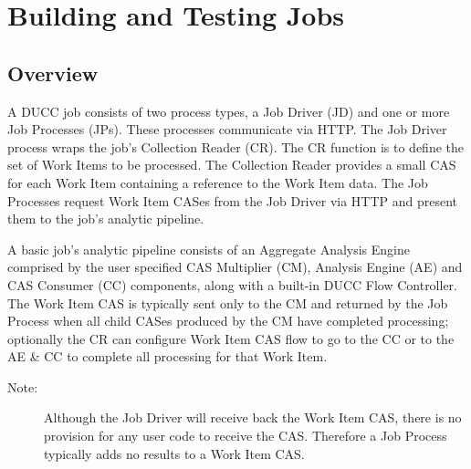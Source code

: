 % 
% 
% 
% 
\chapter{Building and Testing Jobs}

\section{Overview}

A DUCC job consists of two process types, a Job Driver (JD) and one or more
Job Processes (JPs). These processes communicate via HTTP.
The Job Driver process wraps the job's Collection Reader (CR). The CR
function is to define the set of Work Items to be processed.
The Collection Reader provides a small CAS for each Work Item containing a
reference to the Work Item data.
The Job Processes request Work Item CASes from the Job Driver via HTTP 
and present them to the job's analytic pipeline.

A basic job's analytic pipeline consists of an Aggregate Analysis Engine comprised by
the user specified CAS Multiplier (CM), Analysis Engine (AE) and CAS
Consumer (CC) components, along with a built-in DUCC Flow Controller.
The Work Item CAS is typically sent only to the CM and returned by
the Job Process when all child CASes produced by the CM have completed
processing; optionally the CR can configure Work Item CAS flow to go to the CC 
or to the AE \& CC to complete all processing for that Work Item.

	\begin{description}
	    \item[Note:] Although the Job Driver will receive back the Work Item CAS, 
	    there is no provision for any user code to receive the CAS. Therefore a
		Job Process typically adds no results to a Work Item CAS.
	\end{description}

